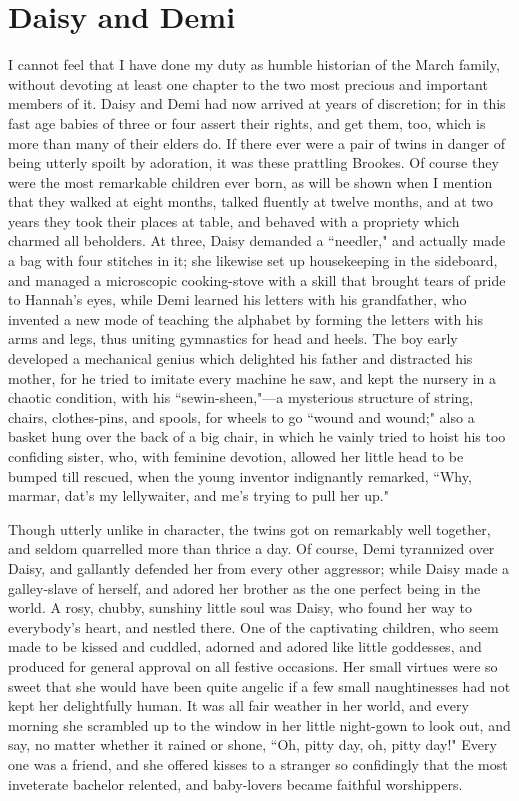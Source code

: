\chapter{Daisy and Demi}

{I cannot} feel that I have done my duty as humble historian of the
March family, without devoting at least one chapter to the two most
precious and important members of it. Daisy and Demi had now arrived at
years of discretion; for in this fast age babies of three or four assert
their rights, and get them, too, which is more than many of their elders
do. If there ever were a pair of twins in danger of being utterly spoilt
by adoration, it was these prattling Brookes. Of course they were the
most remarkable children ever born, as will be shown when I mention that
they walked at eight months, talked fluently at twelve months, and at
two years they took their places at table, and behaved with a propriety
which charmed all beholders. At three, Daisy demanded a ``needler," and
actually made a bag with four stitches in it; she likewise set up
housekeeping in the sideboard, and managed a microscopic cooking-stove
with a skill that brought tears of pride to Hannah's
eyes, while Demi learned his letters with his grandfather, who invented
a new mode of teaching the alphabet by forming the letters with his arms
and legs, thus uniting gymnastics for head and heels. The boy early
developed a mechanical genius which delighted his father and distracted
his mother, for he tried to imitate every machine he saw, and kept the
nursery in a chaotic condition, with his ``sewin-sheen,"---a mysterious
structure of string, chairs, clothes-pins, and spools, for wheels to go
``wound and wound;" also a basket hung over the back of a big chair, in
which he vainly tried to hoist his too confiding sister, who, with
feminine devotion, allowed her little head to be bumped till rescued,
when the young inventor indignantly remarked, ``Why, marmar,
dat's my lellywaiter, and me's trying to
pull her up."

Though utterly unlike in character, the twins got on remarkably well
together, and seldom quarrelled more than thrice a day. Of course, Demi
tyrannized over Daisy, and gallantly defended her from every other
aggressor; while Daisy made a galley-slave of herself, and adored her
brother as the one perfect being in the world. A rosy, chubby, sunshiny
little soul was Daisy, who found her way to everybody's
heart, and nestled there. One of the captivating children, who seem made
to be kissed and cuddled, adorned and adored like little goddesses, and
produced for general approval on all festive occasions. Her small
virtues were so sweet that she would have been quite angelic if a few
small naughtinesses had not kept her delightfully human. It was all fair
weather in her world, and every morning she scrambled up to the window
in her little night-gown to look out, and say, no matter whether it
rained or shone, ``Oh, pitty day, oh, pitty day!" Every one was a friend,
and she offered kisses to a stranger so confidingly that the most
inveterate bachelor relented, and baby-lovers became faithful
worshippers.

